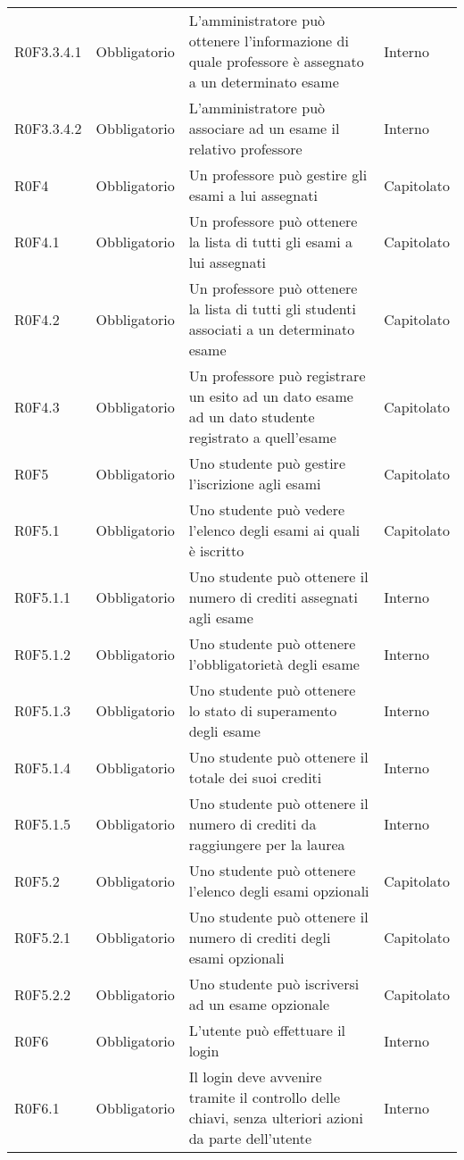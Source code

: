 \documentclass[AnalisiDeiRequisiti.tex]{subfiles}
\begin{document}
\begin{longtable}[H]{p{2.6cm}p{2.5cm}p{5cm}p{2cm}}
	R0F3.3.4.1 & Obbligatorio & L'amministratore può ottenere l'informazione di quale professore è assegnato a un determinato esame & Interno \\  
	R0F3.3.4.2  & Obbligatorio & L'amministratore può associare ad un esame il relativo professore & Interno \\  
	R0F4 & Obbligatorio & Un professore può gestire gli esami a lui assegnati & Capitolato \\  
	R0F4.1 & Obbligatorio & Un professore può ottenere la lista di tutti gli esami a lui assegnati & Capitolato \\  
	R0F4.2 & Obbligatorio & Un professore può ottenere la lista di tutti gli studenti associati a un determinato esame & Capitolato \\  
	R0F4.3 & Obbligatorio & Un professore può registrare un esito ad un dato esame ad un dato studente registrato a quell'esame & Capitolato \\  
	R0F5 & Obbligatorio & Uno studente può gestire l'iscrizione agli esami & Capitolato \\  
	R0F5.1 & Obbligatorio & Uno studente può vedere l'elenco degli esami ai quali è iscritto & Capitolato \\  
	R0F5.1.1 & Obbligatorio & Uno studente può ottenere il numero di crediti assegnati agli esame & Interno \\  
	R0F5.1.2 & Obbligatorio & Uno studente può ottenere l'obbligatorietà degli esame & Interno \\  
	R0F5.1.3 & Obbligatorio & Uno studente può ottenere lo stato di superamento degli esame & Interno \\  
	R0F5.1.4 & Obbligatorio & Uno studente può ottenere il totale dei suoi crediti & Interno \\  
	R0F5.1.5 & Obbligatorio & Uno studente può ottenere il numero di crediti da raggiungere per la laurea & Interno \\  
	R0F5.2 & Obbligatorio & Uno studente può ottenere l'elenco degli esami opzionali & Capitolato \\  
	R0F5.2.1 & Obbligatorio & Uno studente può ottenere il numero di crediti degli esami opzionali & Capitolato \\  
	R0F5.2.2 & Obbligatorio & Uno studente può iscriversi ad un esame opzionale & Capitolato \\  
	R0F6 & Obbligatorio & L'utente può effettuare il login & Interno \\  
	R0F6.1 & Obbligatorio & Il login deve avvenire tramite il controllo delle chiavi, senza ulteriori azioni da parte dell'utente & Interno \\  

\end{longtable}
\end{document}
